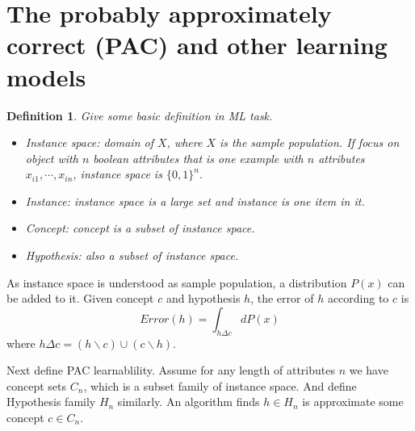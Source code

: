 \documentclass[12pt, a4paper, oneside]{article}
\newtheorem{definition}[theorem]{Definition}
\begin{document}
\setcounter{page}{1}
\section[Section title sans citation]{The probably approximately correct (PAC) and other learning models\cite{haussler2018probably}}
\begin{definition}
    Give some basic definition in ML task.

    \begin{itemize}
        \item Instance space: domain of $X$, where $X$ is the sample population. If focus on object with $n$ boolean attributes that is one example with $n$ attributes $x_{i1},\cdots,x_{in}$, instance space is $\{0,1\}^n$.
        \item Instance: instance space is a large set and instance is one item in it.
        \item Concept: concept is a subset of instance space.
        \item Hypothesis: also a subset of instance space.
    \end{itemize}
\end{definition}
As instance space is understood as sample population, a distribution $P(x)$ can be added to it. Given concept $c$ and hypothesis $h$, the error of $h$ according to $c$ is
\begin{equation*}
    Error(h)=\int_{h\Delta c}dP(x)
\end{equation*}
where $h\Delta c=(h\backslash c)\cup(c\backslash h)$.


Next define PAC learnablility. Assume for any length of attributes $n$ we have concept sets $C_n$, which is a subset family of instance space. And define Hypothesis family $H_n$ similarly. An algorithm finds $h\in H_n$ is approximate some concept $c\in C_n$.
\end{document}

